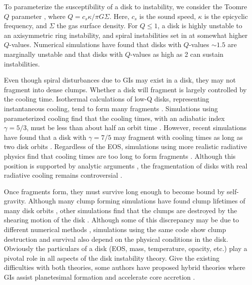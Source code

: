 \documentclass[12pt,preprint2]{aastex}
\begin{document}
To parameterize the susceptibility of a disk to instability, we consider the Toomre $Q$ parameter \citep{toomre1964},
where $Q = c_s\kappa/\pi G\Sigma$. Here, $c_s$ is the sound speed, $\kappa$ is the epicyclic frequency, and $\Sigma$ the
gas surface density.
For $Q \leq 1$, a disk is highly unstable to an axisymmetric ring instability, and spiral instabilities set in at somewhat higher $Q$-values. Numerical simulations have found that disks with $Q$-values $\sim 1.5$ are marginally unstable \citep{boss2000,pickett2003} and that disks with $Q$-values as high as 2 can sustain instabilities. 

Even though spiral disturbances due to GIs may exist in a disk, they may not fragment into dense clumps. Whether a disk
will fragment is largely controlled by the cooling time. Isothermal calculations of low-Q disks, representing
instantaneous cooling, tend to form many fragments \citep{boss2000,pickett2003}. Simulations using parameterized cooling
find that the cooling times, with an adiabatic index $\gamma = 5/3$, must be less than about half an orbit time
\citep{gammie2001,rice2003b,mejia2005}. However, recent simulations have found that a disk with $\gamma = 7/5$ may
fragment with cooling times as long as two disk orbits \citep{rice2005}. Regardless of the EOS, simulations
using more realistic radiative physics find that cooling times are too long to form fragments
\citep{cai2006,cai2008,boley2006,boley2007b}. Although this position is supported by analytic arguments
\citep{rafikov2005,rafikov2007}, the fragmentation of disks with real radiative cooling remains controversial
\citep{boss2007,mayer2007,durisen2007}.

Once fragments form, they must survive long enough to become bound by self-gravity. Although many clump forming
simulations have found clump lifetimes of many disk orbits \citep{boss2003,rice2003b,mayer2004}, other
simulations find that the clumps are destroyed by the shearing motion of the disk
\citep{pickett2003,mejia2005}. Although some of this discrepancy may be due to different numerical methods
\citep{pickett2007}, simulations using the same code show clump destruction and survival also depend on the physical
conditions in the disk. Obviously the particulars of a disk (EOS, mass, temperature, opacity, etc.)
play a pivotal role in all aspects of the disk instability theory. Give the existing difficulties with both theories,
some authors have proposed hybrid theories where GIs assist planetesimal formation and accelerate core accretion
\citep{hag2003b,rice2004,durisen2005}.
\end{document}
